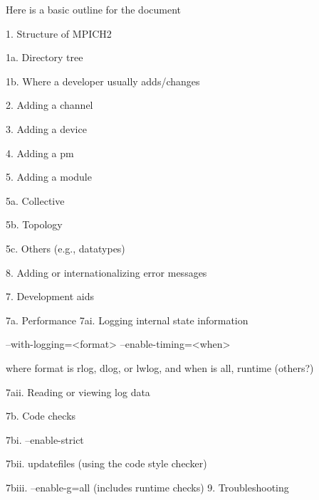 \documentclass[dvipdfm,11pt]{article}
\begin{document}
Here is a basic outline for the document

1. Structure of MPICH2 

   1a. Directory tree

   1b. Where a developer usually adds/changes

2. Adding a channel

3. Adding a device

4. Adding a pm

5. Adding a module

  5a. Collective

  5b. Topology

  5c. Others (e.g., datatypes)

8. Adding or internationalizing error messages

7. Development aids

  7a. Performance
      7ai. Logging internal state information
  
      --with-logging=<format> --enable-timing=<when>

      where format is rlog, dlog, or lwlog, and when is all, runtime (others?)

      7aii. Reading or viewing log data

   7b. Code checks
 
      7bi. --enable-strict

      7bii.  updatefiles (using the code style checker)

      7biii. --enable-g=all (includes runtime checks)
9. Troubleshooting
\end{document}
